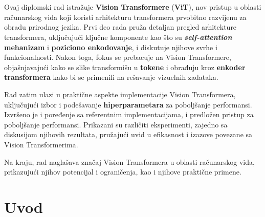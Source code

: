 \documentclass[12pt]{article}
\begin{document}
   \newpage


   \renewcommand{\contentsname}{Sadržaj}
   \tableofcontents
   \thispagestyle{empty} %

   
   \newpage
   
   \thispagestyle{empty} %

   \newcommand{\specialsection}[1]{
      \section*{\centering{#1}} %
   }

   \vspace*{0.5in}
   \specialsection{Apstrakt}
   

   \vspace*{0.5in}

   Ovaj diplomski rad istražuje \textbf{Vision Transformere} (\textbf{ViT}),
   nov pristup u oblasti računarskog vida koji koristi arhitekturu
   transformera prvobitno razvijenu za obradu prirodnog jezika. Prvi deo rada pruža detaljan pregled arhitekture transformera, 
   uključujući ključne komponente kao što su \textbf{\textit{self-attention} mehanizam} i \textbf{poziciono enkodovanje},
   i diskutuje njihove svrhe i funkcionalnosti. Nakon toga, fokus se prebacuje
   na Vision Transformere, objašnjavajući kako se slike transformišu
   u \textbf{tokene} i obrađuju kroz \textbf{enkoder transformera} kako bi se primenili na rešavanje vizuelnih zadataka.

   Rad zatim ulazi u praktične aspekte implementacije Vision Transformera,
   uključujući izbor i podešavanje \textbf{hiperparametara} za poboljšanje performansi.
   Izvršeno je i poređenje sa referentnim implementacijama, i predložen pristup za 
   poboljšanje performansi. Prikazani su različiti
   eksperimenti, zajedno sa diskusijom njihovih rezultata, pružajući uvid
   u efikasnost i izazove povezane sa Vision Transformerima.

   Na kraju, rad naglašava značaj Vision Transformera u oblasti računarskog vida, 
   prikazujući njihov potencijal i ograničenja, kao i njihove praktične primene.

   \newpage
   \setcounter{page}{1}

   \section{Uvod}
   
\end{document}

